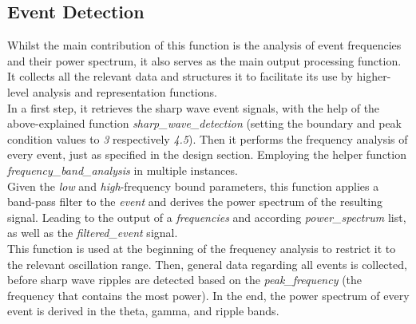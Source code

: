     \subsection{Event Detection}
    Whilst the main contribution of this function is the analysis of event frequencies and their power spectrum, it also serves as the main output processing function. It collects all the relevant data and structures it to facilitate its use by higher-level analysis and representation functions.\\
    In a first step, it retrieves the sharp wave event signals, with the help of the above-explained function \textit{sharp\_wave\_detection} (setting the boundary and peak condition values to \textit{3} respectively \textit{4.5}). Then it performs the frequency analysis of every event, just as specified in the design section. Employing the helper function \textit{frequency\_band\_analysis} in multiple instances.\\
    Given the \textit{low} and \textit{high}-frequency bound parameters, this function applies a band-pass filter to the \textit{event} and derives the power spectrum of the resulting signal. Leading to the output of a \textit{frequencies} and according \textit{power\_spectrum} list, as well as the \textit{filtered\_event} signal.\\
    This function is used at the beginning of the frequency analysis to restrict it to the relevant oscillation range. Then, general data regarding all events is collected, before sharp wave ripples are detected based on the \textit{peak\_frequency} (the frequency that contains the most power). In the end, the power spectrum of every event is derived in the theta, gamma, and ripple bands.\\
